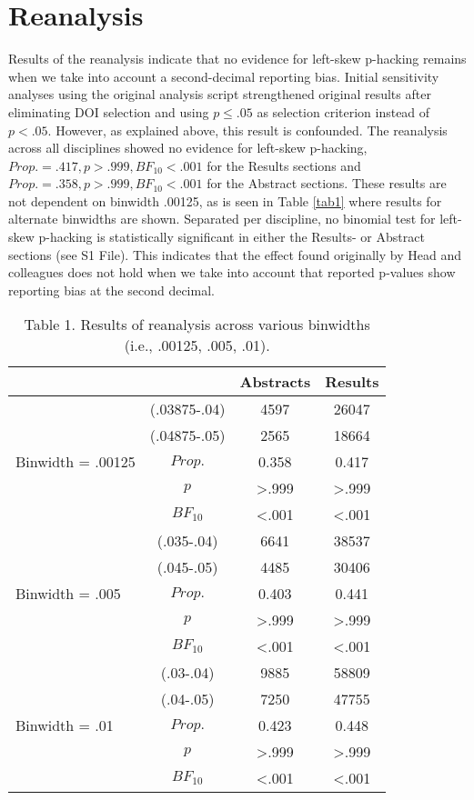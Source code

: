 \section*{Reanalysis}
Results of the reanalysis indicate that no evidence for left-skew p-hacking remains when we take into account a second-decimal reporting bias. Initial sensitivity analyses using the original analysis script strengthened original results after eliminating DOI selection and using $p\leq.05$ as selection criterion instead of $p<.05$. However, as explained above, this result is confounded. The reanalysis across all disciplines showed no evidence for left-skew p-hacking, $Prop.=.417,p>.999, BF_{10}<.001$ for the Results sections and $Prop.=.358,p>.999,BF_{10}<.001$ for the Abstract sections. These results are not dependent on binwidth .00125, as is seen in Table \ref{tab1} where results for alternate binwidths are shown.  Separated per discipline, no binomial test for left-skew p-hacking is statistically significant in either the Results- or Abstract sections (see S1 File). This indicates that the effect found originally by Head and colleagues does not hold when we take into account that reported p-values show reporting bias at the second decimal.

\begin{table}[htbp]
    \begin{tabular}{cccc}
              &       & Abstracts & Results \\
              \hline
    \multicolumn{1}{l}{\multirow{5}[0]{*}{Binwidth = .00125}} & (.03875-.04) & 4597  & 26047 \\
    \multicolumn{1}{l}{} & (.04875-.05) & 2565  & 18664 \\
    \multicolumn{1}{l}{} & $Prop.$ & 0.358 & 0.417 \\
    \multicolumn{1}{l}{} & $p$     & >.999 & >.999 \\
    \multicolumn{1}{l}{} & $BF_{10}$  & <.001 & <.001 \\
    \multicolumn{1}{l}{\multirow{5}[0]{*}{Binwidth = .005}} & (.035-.04) & 6641  & 38537 \\
    \multicolumn{1}{l}{} & (.045-.05) & 4485  & 30406 \\
    \multicolumn{1}{l}{} & $Prop.$ & 0.403 & 0.441 \\
    \multicolumn{1}{l}{} & $p$     & >.999 & >.999 \\
    \multicolumn{1}{l}{} & $BF_{10}$  & <.001 & <.001 \\
    \multicolumn{1}{l}{\multirow{5}[0]{*}{Binwidth = .01}} & (.03-.04) & 9885  & 58809 \\
    \multicolumn{1}{l}{} & (.04-.05) & 7250  & 47755 \\
    \multicolumn{1}{l}{} & $Prop.$ & 0.423 & 0.448 \\
    \multicolumn{1}{l}{} & $p$     & >.999 & >.999 \\
    \multicolumn{1}{l}{} & $BF_{10}$  & <.001 & <.001 \\
    \end{tabular}
    \caption{Table 1. Results of reanalysis across various binwidths (i.e., .00125, .005, .01).} 
\end{table}
  
